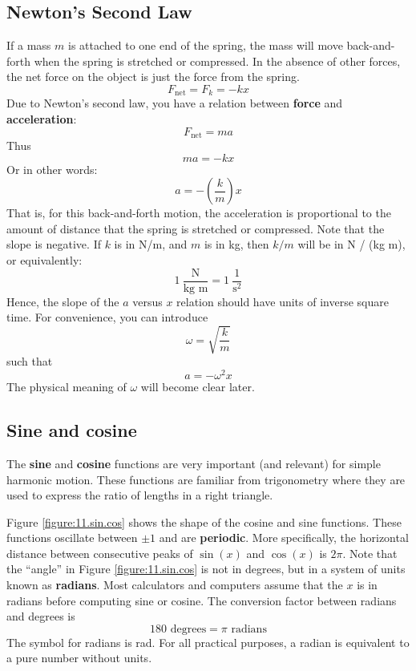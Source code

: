 \subsection{Newton's Second Law}
%
If a mass $m$ is attached to one end of the spring, the mass will move back-and-forth when the spring is stretched or compressed. In the absence of other forces, the net force on the object is just the force from the spring.
\begin{equation}
    F_{\text{net}} = F_{k} = -kx
\end{equation}
Due to Newton's second law, you have a relation between \textbf{force} and \textbf{acceleration}:
\begin{equation}
    F_{\text{net}} = m a
\end{equation}
Thus
\begin{equation}
    ma = -kx
\end{equation}
Or in other words:
\begin{equation}
    a = -\left( \frac{k}{m} \right) x
    \label{eq.11.ax}
\end{equation}
That is, for this back-and-forth motion, the acceleration is proportional to the amount of distance that the spring is stretched or compressed. Note that the slope is negative. If $k$ is in N/m, and $m$ is in kg, then $k/m$ will be in N / (kg m), or equivalently:
\begin{equation}
    1 \ \frac{\text{N}}{\text{kg m}} = 1 \ \frac{1}{\text{s}^{2}}
\end{equation}
Hence, the slope of the $a$ versus $x$ relation should have units of inverse square time. For convenience, you can introduce
\begin{equation}
    \omega = \sqrt{\frac{k}{m}}
\end{equation}
such that
\begin{equation}
    a = - \omega^{2} x
    \label{eq:11.axomega}
\end{equation}
The physical meaning of $\omega$ will become clear later.
%
\subsection{Sine and cosine}
%
The \textbf{sine} and \textbf{cosine} functions are very important (and relevant) for simple harmonic motion. These functions are familiar from trigonometry where they are used to express the ratio of lengths in a right triangle.

Figure \ref{figure:11.sin.cos} shows the shape of the cosine and sine functions. These functions oscillate between $\pm 1$ and are \textbf{periodic}. More specifically, the horizontal distance between consecutive peaks of $\sin(x)$ and $\cos(x)$ is $2\pi$. Note that the ``angle'' in Figure \ref{figure:11.sin.cos} is not in degrees, but in a system of units known as \textbf{radians}. Most calculators and computers assume that the $x$ is in radians before computing sine or cosine. The conversion factor between radians and degrees is
\begin{equation}
    180 \text{ degrees} = \pi \text{ radians}
\end{equation}
The symbol for radians is rad. For all practical purposes, a radian is equivalent to a pure number without units.
%
